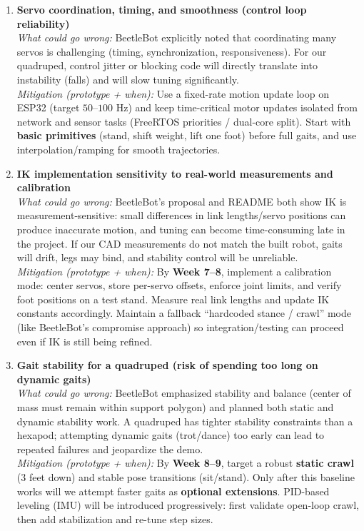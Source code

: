 \documentclass{article}
\begin{document}
\begin{enumerate}
  \item \textbf{Servo coordination, timing, and smoothness (control loop reliability)} \\
        \textit{What could go wrong:} BeetleBot explicitly noted that coordinating many servos is challenging (timing, synchronization, responsiveness). For our quadruped, control jitter or blocking code will directly translate into instability (falls) and will slow tuning significantly. \\
        \textit{Mitigation (prototype + when):} Use a fixed-rate motion update loop on ESP32 (target $50$--$100$ Hz) and keep time-critical motor updates isolated from network and sensor tasks (FreeRTOS priorities / dual-core split). Start with \textbf{basic primitives} (stand, shift weight, lift one foot) before full gaits, and use interpolation/ramping for smooth trajectories.

  \item \textbf{IK implementation sensitivity to real-world measurements and calibration} \\
        \textit{What could go wrong:} BeetleBot’s proposal and README both show IK is measurement-sensitive: small differences in link lengths/servo positions can produce inaccurate motion, and tuning can become time-consuming late in the project. If our CAD measurements do not match the built robot, gaits will drift, legs may bind, and stability control will be unreliable. \\
        \textit{Mitigation (prototype + when):} By \textbf{Week 7--8}, implement a calibration mode: center servos, store per-servo offsets, enforce joint limits, and verify foot positions on a test stand. Measure real link lengths and update IK constants accordingly. Maintain a fallback “hardcoded stance / crawl” mode (like BeetleBot’s compromise approach) so integration/testing can proceed even if IK is still being refined.

  \item \textbf{Gait stability for a quadruped (risk of spending too long on dynamic gaits)} \\
        \textit{What could go wrong:} BeetleBot emphasized stability and balance (center of mass must remain within support polygon) and planned both static and dynamic stability work. A quadruped has tighter stability constraints than a hexapod; attempting dynamic gaits (trot/dance) too early can lead to repeated failures and jeopardize the demo. \\
        \textit{Mitigation (prototype + when):} By \textbf{Week 8--9}, target a robust \textbf{static crawl} (3 feet down) and stable pose transitions (sit/stand). Only after this baseline works will we attempt faster gaits as \textbf{optional extensions}. PID-based leveling (IMU) will be introduced progressively: first validate open-loop crawl, then add stabilization and re-tune step sizes.


\end{enumerate}
\end{document}
